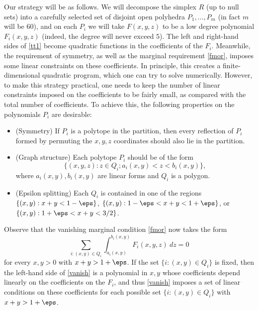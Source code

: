 Our strategy will be as follows.  We will decompose the simplex $R$ (up to null sets) into a carefully selected set of disjoint open polyhedra $P_1,\dots,P_m$ (in fact $m$ will be $60$), and on each $P_i$ we will take $F(x,y,z)$ to be a low degree polynomial $F_i(x,y,z)$ (indeed, the degree will never exceed $5$).  The left and right-hand sides of \eqref{tt1} become quadratic functions in the coefficients of the $F_i$.  Meanwhile, the requirement of symmetry, as well as the marginal requirement \eqref{fmor}, imposes some linear constraints on these coefficients.  In principle, this creates a finite-dimensional quadratic program, which one can try to solve numerically.  However, to make this strategy practical, one needs to keep the number of linear constraints imposed on the coefficients to be fairly small, as compared with the total number of coefficients.  To achieve this, the following properties on the polynomials $P_i$ are desirable:

\begin{itemize}
\item (Symmetry) If $P_i$ is a polytope in the partition, then every reflection of $P_i$ formed by permuting the $x,y,z$ coordinates should also lie in the partition.
\item (Graph structure) Each polytope $P_i$ should be of the form 
\begin{equation}\label{qi-form}
\{ (x,y,z): z \in Q_i; a_i(x,y) < z < b_i(x,y)\},
\end{equation}
where $a_i(x,y), b_i(x,y)$ are linear forms and $Q_i$ is a polygon.
\item (Epsilon splitting)  Each $Q_i$ is contained in one of the regions $\{ (x,y): x+y < 1-\eps\}$, $\{ (x,y): 1-\eps < x+y < 1+\eps \}$, or $\{ (x,y): 1+\eps < x+y < 3/2 \}$.
\end{itemize}

Observe that the vanishing marginal condition \eqref{fmor} now takes the form
\begin{equation}\label{vanish}
 \sum_{i: (x,y) \in Q_i} \int_{a_i(x,y)}^{b_i(x,y)} F_i(x,y,z)\ dz = 0
\end{equation}
for every $x,y > 0$ with $x+y > 1+\eps$.  If the set $\{i: (x,y) \in Q_i\}$ is fixed, then the left-hand side of \eqref{vanish} is a polynomial in $x,y$ whose coefficients depend linearly on the coefficients on the $F_i$, and thus \eqref{vanish} imposes a set of linear conditions on these coefficients for each possible set $\{ i: (x,y) \in Q_i\}$ with $x+y > 1+\eps$.

